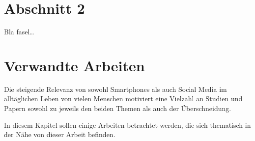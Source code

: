 \section{Abschnitt 2}
\label{ch:Grundlagen:sec:Abschnitt2}

Bla fasel\ldots

\section{Verwandte Arbeiten}
\label{ch:Grundlagen:sec:RelatedWork}

Die steigende Relevanz von sowohl Smartphones als auch Social Media im alltäglichen Leben von vielen Menschen
motiviert eine Vielzahl an Studien und Papern sowohl zu jeweils den beiden Themen als auch der Überschneidung. 

In diesem Kapitel sollen einige Arbeiten betrachtet werden, die sich thematisch in der Nähe von dieser Arbeit befinden.



